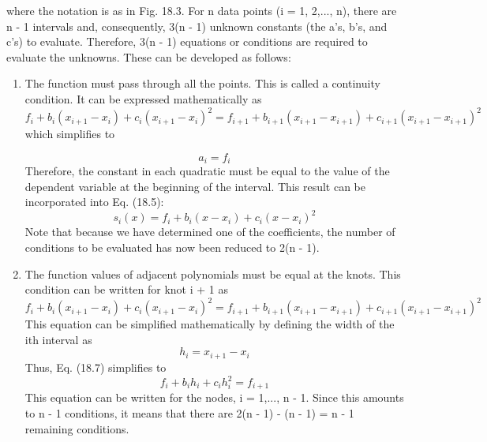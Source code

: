 \documentclass[../main.tex]{subfiles}
\begin{document}
where the notation is as in Fig. 18.3. For n data points (i = 1, 2,..., n), there are n - 1
intervals and, consequently, 3(n - 1) unknown constants (the a's, b's, and c's) to evaluate.
Therefore, 3(n - 1) equations or conditions are required to evaluate the unknowns. These
can be developed as follows:
\begin{enumerate}
    \item The function must pass through all the points. This is called a continuity condition. It
    can be expressed mathematically as
\begin{equation}
    f_{i}+b_{i}\left(x_{i+1}-x_{i}\right)+c_{i}\left(x_{i+1}-x_{i}\right)^{2}=f_{i+1}+b_{i+1}\left(x_{i+1}-x_{i+1}\right)+c_{i+1}\left(x_{i+1}-x_{i+1}\right)^{2}
    \nonumber
\end{equation}
which simplifies to

\begin{equation}
    \tag{18.6}
    a_{i}=f_{i}
\end{equation}
Therefore, the constant in each quadratic must be equal to the value of the dependent
variable at the beginning of the interval. This result can be incorporated into Eq. (18.5):
\begin{equation}
    s_{i}(x)=f_{i}+b_{i}\left(x-x_{i}\right)+c_{i}\left(x-x_{i}\right)^{2} \nonumber
    \end{equation}
    Note that because we have determined one of the coefficients, the number of conditions to be evaluated has now been reduced to 2(n - 1).

    \item The function values of adjacent polynomials must be equal at the knots. This condition
    can be written for knot i + 1 as
    \begin{equation}
        \tag{18.7}
        f_{i}+b_{i}\left(x_{i+1}-x_{i}\right)+c_{i}\left(x_{i+1}-x_{i}\right)^{2}=f_{i+1}+b_{i+1}\left(x_{i+1}-x_{i+1}\right)+c_{i+1}\left(x_{i+1}-x_{i+1}\right)^{2}
        \end{equation}
        This equation can be simplified mathematically by defining the width of the ith interval as
        \begin{equation}
            h_{i}=x_{i+1}-x_{i} \nonumber
            \end{equation}
Thus, Eq. (18.7) simplifies to
\begin{equation}
    \tag{18.8}
    f_{i}+b_{i} h_{i}+c_{i} h_{i}^{2}=f_{i+1}
    \end{equation}
    This equation can be written for the nodes, i = 1,..., n - 1. Since this amounts to
    n - 1 conditions, it means that there are 2(n - 1) - (n - 1) = n - 1 remaining
    conditions.
    

\end{enumerate}
\end{document}
